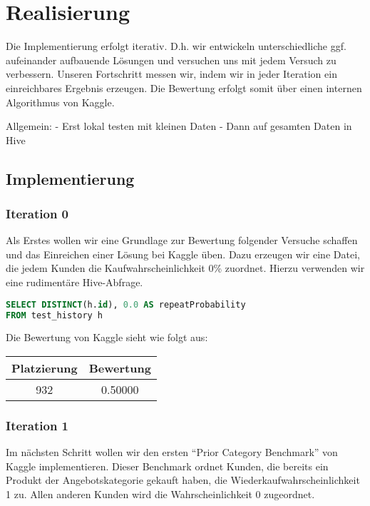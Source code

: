\section{Realisierung}

Die Implementierung erfolgt iterativ. D.h. wir entwickeln unterschiedliche ggf. aufeinander aufbauende Lösungen
und versuchen uns mit jedem Versuch zu verbessern. Unseren Fortschritt messen wir, indem wir in jeder
Iteration ein einreichbares Ergebnis erzeugen. Die Bewertung erfolgt somit über einen internen Algorithmus
von Kaggle.

Allgemein:
- Erst lokal testen mit kleinen Daten
- Dann auf gesamten Daten in Hive

\subsection{Implementierung}

\subsubsection{Iteration 0}
\label{sec:iteration0}

Als Erstes wollen wir eine Grundlage zur Bewertung folgender Versuche schaffen und das Einreichen einer
Lösung bei Kaggle üben. Dazu erzeugen wir eine Datei, die jedem Kunden die Kaufwahrscheinlichkeit 0\%
zuordnet. Hierzu verwenden wir eine rudimentäre Hive-Abfrage.

\begin{lstlisting}[language=SQL]
SELECT DISTINCT(h.id), 0.0 AS repeatProbability 
FROM test_history h
\end{lstlisting}

Die Bewertung von Kaggle sieht wie folgt aus:

\begin{tabular}{|c|c|}
	\hline \textbf{Platzierung} & \textbf{Bewertung} \\ 
	\hline 932 & 0.50000  \\ 
	\hline 
\end{tabular}

\subsubsection{Iteration 1}

Im nächsten Schritt wollen wir den ersten "`Prior Category Benchmark"' von Kaggle implementieren.
Dieser Benchmark ordnet Kunden, die bereits ein Produkt der Angebotskategorie gekauft haben, die
Wiederkaufwahrscheinlichkeit 1 zu. Allen anderen Kunden wird die Wahrscheinlichkeit 0 zugeordnet.


